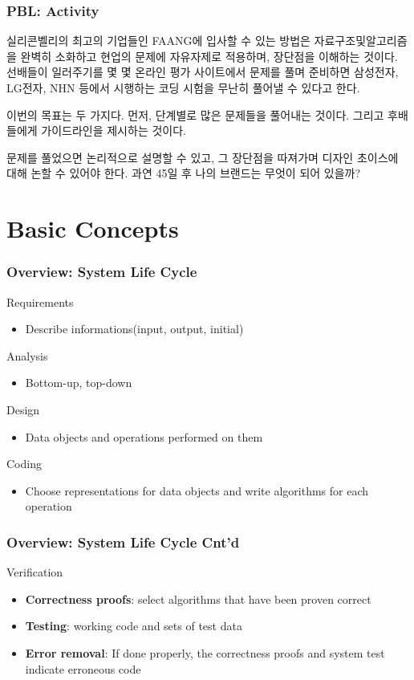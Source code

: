 \documentclass[newPxFont,sthlmFooter,nooffset]{beamer}
\begin{document}
\begin{frame}[t]
  \frametitle{PBL: Activity}
  \begin{Problem}
    실리콘벨리의 최고의 기업들인 FAANG에 입사할 수 있는 방법은 자료구조및알고리즘을 완벽히 소화하고 현업의 문제에 자유자제로 적용하며, 장단점을 이해하는 것이다. 선배들이 일러주기를 몇 몇 온라인 평가 사이트에서 문제를 풀며 준비하면 삼성전자, LG전자, NHN 등에서 시행하는 코딩 시험을 무난히 풀어낼 수 있다고 한다.

    이번의 목표는 두 가지다. 먼저, 단계별로 많은 문제들을 풀어내는 것이다. 그리고 후배들에게 가이드라인을 제시하는 것이다.

    문제를 풀었으면 논리적으로 설명할 수 있고, 그 장단점을 따져가며 디자인 초이스에 대해 논할 수 있어야 한다. 과연 45일 후 나의 브랜드는 무엇이 되어 있을까?
  \end{Problem}



  
\end{frame}

\section{Basic Concepts}

\begin{frame}[t]
  \frametitle{Overview: System Life Cycle}
  
Requirements
\begin{itemize}
\item Describe informations(input, output, initial)
\end{itemize}

Analysis
\begin{itemize}
\item Bottom-up, top-down
\end{itemize}

Design
\begin{itemize}
\item Data objects and operations performed on them
\end{itemize}

Coding
\begin{itemize}
\item Choose representations for data objects and write algorithms for
  each operation
\end{itemize}

\end{frame}


\begin{frame}[t]
  \frametitle{Overview: System Life Cycle Cnt'd}
Verification
\begin{itemize}
\item \textbf{Correctness proofs}: select algorithms that have been proven correct
\item \textbf{Testing}: working code and sets of test data
\item \textbf{Error removal}: If done properly, the correctness proofs
  and system test indicate erroneous code
\end{itemize}
\end{frame}
\end{document}
